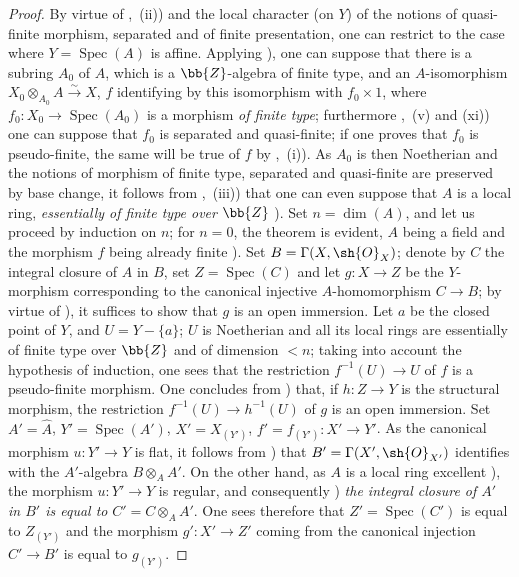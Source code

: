 \begin{proof}
By virtue of ,~(ii)) and the local character (on $Y$) of the notions of quasi-finite morphism, separated and of finite presentation, one can restrict to the case where $Y=\operatorname{Spec}(A)$ is affine.
Applying ), one can suppose that there is a subring $A_0$ of $A$, which is a $\bb{Z}$-algebra of finite type, and an $A$-isomorphism $X_0\otimes_{A_0}A\xrightarrow{\sim}X$, $f$ identifying by this isomorphism with $f_0\times 1$, where $f_0:X_0\to\operatorname{Spec}(A_0)$ is a morphism \emph{of finite type}; furthermore ,~(v) and (xi)) one can suppose that $f_0$ is separated and quasi-finite; if one proves that $f_0$ is pseudo-finite, the same will be true of $f$ by ,~(i)).
As $A_0$ is then Noetherian and the notions of morphism of finite type, separated and quasi-finite are preserved by base change, it follows from ,~(iii)) that one can even suppose that $A$ is a local ring, \emph{essentially of finite type over} $\bb{Z}$ ).
Set $n=\dim(A)$, and let us proceed by induction on $n$; for $n=0$, the theorem is evident, $A$ being a field and the morphism $f$ being already finite ).
Set $B=\Gamma(X,\sh{O}_X)$; denote by $C$ the integral closure of $A$ in $B$, set $Z=\operatorname{Spec}(C)$ and let $g:X\to Z$ be the $Y$-morphism corresponding to the canonical injective $A$-homomorphism $C\to B$; by virtue of ), it suffices to show that $g$ is an open immersion.
Let $a$ be the closed point of $Y$, and $U=Y-\{a\}$; $U$ is Noetherian and all its local rings are essentially of finite type over $\bb{Z}$ and of dimension $<n$; taking into account the hypothesis of induction, one sees that the restriction $f^{-1}(U)\to U$ of $f$ is a pseudo-finite morphism.
One concludes from ) that, if $h:Z\to Y$ is the structural morphism, the restriction $f^{-1}(U)\to h^{-1}(U)$ of $g$ is an open immersion.
Set $A'=\hat{A}$, $Y'=\operatorname{Spec}(A')$, $X'=X_{(Y')}$, $f'=f_{(Y')}:X'\to Y'$.
As the canonical morphism $u:Y'\to Y$ is flat, it follows from ) that $B'=\Gamma(X',\sh{O}_{X'})$ identifies with the $A'$-algebra $B\otimes_A A'$.
On the other hand, as $A$ is a local ring excellent ), the morphism $u:Y'\to Y$ is regular, and consequently ) \emph{the integral closure of $A'$ in $B'$ is equal to} $C'=C\otimes_A A'$.
One sees therefore that $Z'=\operatorname{Spec}(C')$ is equal to $Z_{(Y')}$ and the morphism $g':X'\to Z'$ coming from the canonical injection $C'\to B'$ is equal to $g_{(Y')}$.

\end{proof}
